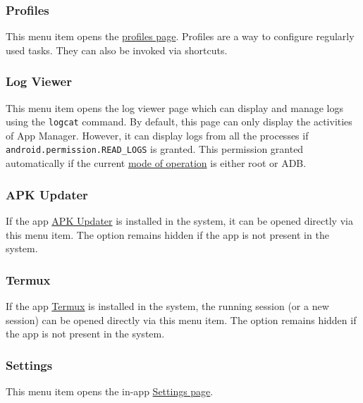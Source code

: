 \subsubsection{Profiles} %
This menu item opens the \hyperref[sec:profiles-page]{profiles page}. Profiles are a way to configure regularly used
tasks. They can also be invoked via shortcuts.

\subsubsection{Log Viewer}\label{subsubsec:log-viewer} %
This menu item opens the log viewer page which can display and manage logs using the \texttt{logcat} command. By
default, this page can only display the activities of App Manager. However, it can display logs from all the
processes if \texttt{android.permission.READ\_LOGS} is granted. This permission granted automatically if the current
\hyperref[subsec:mode-of-operation]{mode of operation} is either root or ADB\@.

\subsubsection{APK Updater} %
If the app \href{https://github.com/rumboalla/apkupdater}{APK Updater} is installed in the system, it can be opened
directly via this menu item. The option remains hidden if the app is not present in the system.

\subsubsection{Termux} %
If the app \href{https://github.com/termux/termux-app}{Termux} is installed in the system, the running session (or a
new session) can be opened directly via this menu item. The option remains hidden if the app is not present in the
system.

\subsubsection{Settings} %
This menu item opens the in-app \hyperref[sec:settings-page]{Settings page}.
